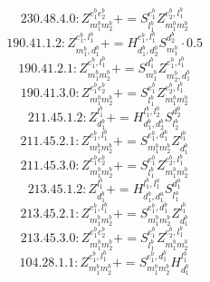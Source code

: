 \documentclass[letterpaper,10pt,fleqn,leqno,onecolumn]{article}
\begin{document}
\begin{equation} \;\;\;\;\;\;  230.48.4.0: Z^{e_{1}^{b}e_{2}^{b}}_{m_{1}^{b}m_{2}^{b}}+=S^{e_{1}^{b}}_{l_{1}^{b}}Z^{e_{2}^{b},l_{1}^{b}}_{m_{1}^{b}m_{2}^{b}} \end{equation}
\begin{equation} \;\;\;\;\;\;  190.41.1.2: Z^{e_{1}^{b},l_{1}^{b}}_{m_{1}^{b},d_{1}^{b}}+=H^{e_{1}^{b},l_{1}^{b}}_{d_{1}^{b},d_{2}^{b}}S^{d_{2}^{b}}_{m_{1}^{b}}\cdot 0.5 \end{equation}
\begin{equation} \;\;\;\;\;\;  190.41.2.1: Z^{e_{1}^{b},l_{1}^{b}}_{m_{1}^{b}m_{2}^{b}}+=S^{d_{1}^{b}}_{m_{1}^{b}}Z^{e_{1}^{b},l_{1}^{b}}_{m_{2}^{b},d_{1}^{b}} \end{equation}
\begin{equation} \;\;\;\;\;\;  190.41.3.0: Z^{e_{1}^{b}e_{2}^{b}}_{m_{1}^{b}m_{2}^{b}}+=S^{e_{1}^{b}}_{l_{1}^{b}}Z^{e_{2}^{b},l_{1}^{b}}_{m_{1}^{b}m_{2}^{b}} \end{equation}
\begin{equation} \;\;\;\;\;\;  211.45.1.2: Z^{l_{1}^{b}}_{d_{1}^{b}}+=H^{l_{1}^{b},l_{2}^{b}}_{d_{1}^{b},d_{2}^{b}}S^{d_{2}^{b}}_{l_{2}^{b}} \end{equation}
\begin{equation} \;\;\;\;\;\;  211.45.2.1: Z^{e_{1}^{b},l_{1}^{b}}_{m_{1}^{b}m_{2}^{b}}+=S^{e_{1}^{b},d_{1}^{b}}_{m_{1}^{b}m_{2}^{b}}Z^{l_{1}^{b}}_{d_{1}^{b}} \end{equation}
\begin{equation} \;\;\;\;\;\;  211.45.3.0: Z^{e_{1}^{b}e_{2}^{b}}_{m_{1}^{b}m_{2}^{b}}+=S^{e_{1}^{b}}_{l_{1}^{b}}Z^{e_{2}^{b},l_{1}^{b}}_{m_{1}^{b}m_{2}^{b}} \end{equation}
\begin{equation} \;\;\;\;\;\;  213.45.1.2: Z^{l_{1}^{b}}_{d_{1}^{b}}+=H^{l_{1}^{b},l_{1}^{a}}_{d_{1}^{b},d_{1}^{a}}S^{d_{1}^{a}}_{l_{1}^{a}} \end{equation}
\begin{equation} \;\;\;\;\;\;  213.45.2.1: Z^{e_{1}^{b},l_{1}^{b}}_{m_{1}^{b}m_{2}^{b}}+=S^{e_{1}^{b},d_{1}^{b}}_{m_{1}^{b}m_{2}^{b}}Z^{l_{1}^{b}}_{d_{1}^{b}} \end{equation}
\begin{equation} \;\;\;\;\;\;  213.45.3.0: Z^{e_{1}^{b}e_{2}^{b}}_{m_{1}^{b}m_{2}^{b}}+=S^{e_{1}^{b}}_{l_{1}^{b}}Z^{e_{2}^{b},l_{1}^{b}}_{m_{1}^{b}m_{2}^{b}} \end{equation}
\begin{equation} \;\;\;\;\;\;  104.28.1.1: Z^{e_{1}^{b},l_{1}^{b}}_{m_{1}^{b}m_{2}^{b}}+=S^{e_{1}^{b},d_{1}^{b}}_{m_{1}^{b}m_{2}^{b}}H^{l_{1}^{b}}_{d_{1}^{b}} \end{equation}
\end{document}

